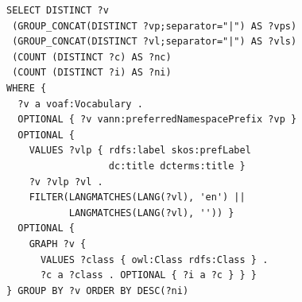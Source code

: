 \begin{lstlisting}[captionpos=b, caption=Q1 -- Query to get a list of vocabularies with class count and class instance count,label=lst:sparql1,basicstyle=\small\ttfamily,frame=single]
SELECT DISTINCT ?v
 (GROUP_CONCAT(DISTINCT ?vp;separator="|") AS ?vps)
 (GROUP_CONCAT(DISTINCT ?vl;separator="|") AS ?vls)     
 (COUNT (DISTINCT ?c) AS ?nc)
 (COUNT (DISTINCT ?i) AS ?ni)
WHERE {
  ?v a voaf:Vocabulary .
  OPTIONAL { ?v vann:preferredNamespacePrefix ?vp }
  OPTIONAL {
    VALUES ?vlp { rdfs:label skos:prefLabel
                  dc:title dcterms:title }
    ?v ?vlp ?vl .
    FILTER(LANGMATCHES(LANG(?vl), 'en') ||
           LANGMATCHES(LANG(?vl), '')) }
  OPTIONAL {
    GRAPH ?v {
      VALUES ?class { owl:Class rdfs:Class } .
      ?c a ?class . OPTIONAL { ?i a ?c } } }
} GROUP BY ?v ORDER BY DESC(?ni)
\end{lstlisting}


